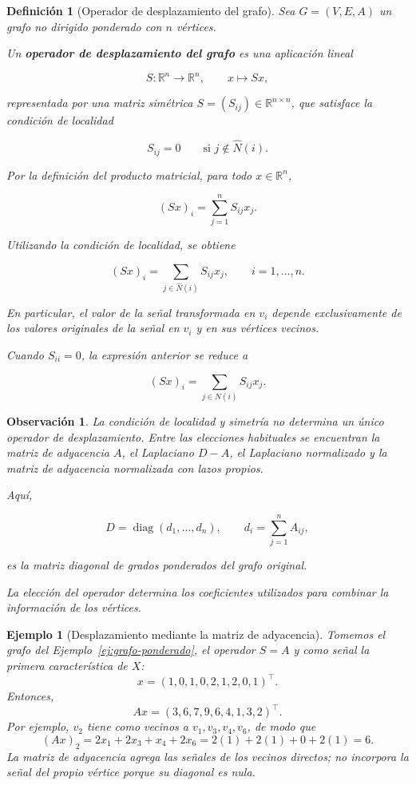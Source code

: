 \documentclass[a4paper,openany,oneside,10pt]{report}
\theoremstyle{pnlTeorema}
\theoremstyle{pnlDefinicion}
\newtheorem{definicion}{Definición}[section]
\theoremstyle{pnlObservacion}
\newtheorem{ejemplo}{Ejemplo}[section]
\newtheorem{observacion}{Observación}[section]
\begin{document}
\begin{definicion}[Operador de desplazamiento del grafo]\label{def:desplazamiento}
Sea \(G=(V,E,A)\) un grafo no dirigido ponderado con \(n\) vértices.

Un \textbf{operador de desplazamiento del grafo} es una aplicación lineal

\[
S:\mathbb R^n\longrightarrow\mathbb R^n,
\qquad x\longmapsto Sx,
\]

representada por una matriz simétrica \(S=(S_{ij})\in\mathbb R^{n\times n}\), que satisface la condición de localidad

\[
S_{ij}=0
\qquad\text{si }j\notin\widehat N(i).
\]

Por la definición del producto matricial, para todo \(x\in\mathbb R^n\),

\[
(Sx)_i=\sum_{j=1}^n S_{ij}x_j.
\]

Utilizando la condición de localidad, se obtiene

\begin{equation}\label{eq:desplazamiento-local}
(Sx)_i=\sum_{j\in\widehat N(i)}S_{ij}x_j,
\qquad i=1,\ldots,n.
\end{equation}

En particular, el valor de la señal transformada en \(v_i\) depende exclusivamente de los valores originales de la señal en \(v_i\) y en sus vértices vecinos.

Cuando \(S_{ii}=0\), la expresión anterior se reduce a

\[
(Sx)_i=\sum_{j\in N(i)}S_{ij}x_j.
\]

\end{definicion}

\begin{observacion}
La condición de localidad y simetría no determina un único operador de desplazamiento. Entre las elecciones habituales se encuentran la matriz de adyacencia \(A\), el Laplaciano \(D-A\), el Laplaciano normalizado y la matriz de adyacencia normalizada con lazos propios.

Aquí,

\[
D=\operatorname{diag}(d_1,\ldots,d_n),
\qquad
d_i=\sum_{j=1}^n A_{ij},
\]

es la matriz diagonal de grados ponderados del grafo original.

La elección del operador determina los coeficientes utilizados para combinar la información de los vértices.
\end{observacion}


\begin{ejemplo}[Desplazamiento mediante la matriz de adyacencia]\label{ej:adyacencia}
Tomemos el grafo del Ejemplo~\ref{ej:grafo-ponderado}, el operador \(S=A\) y como señal la primera característica de \(X\):
\[
x=(1,0,1,0,2,1,2,0,1)^\top.
\]
Entonces,
\[
Ax=(3,6,7,9,6,4,1,3,2)^\top.
\]
Por ejemplo, \(v_2\) tiene como vecinos a \(v_1,v_3,v_4,v_6\), de modo que
\[
(Ax)_2=2x_1+2x_3+x_4+2x_6=2(1)+2(1)+0+2(1)=6.
\]
La matriz de adyacencia agrega las señales de los vecinos directos; no incorpora la señal del propio vértice porque su diagonal es nula.
\end{ejemplo}
\end{document}
